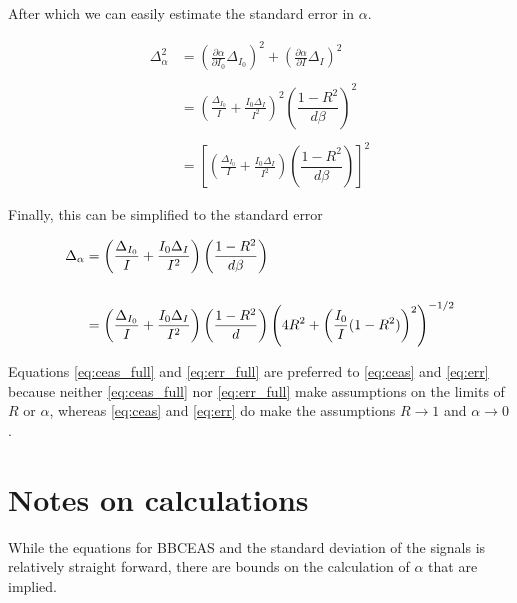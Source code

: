 After which we can easily estimate the standard error in $\alpha$.

\begin{align*}
  \Delta_\alpha^2 &= \left(\frac{\partial \alpha}{\partial I_0} \Delta_{I_0}\right)^2  + \left(\frac{\partial \alpha}{\partial I} \Delta_{I}\right)^2 \\\\
                  &= \left(\frac{\Delta_{I_0}}{I} + \frac{I_0\Delta_{I}}{I^2}\right)^2 \left(\dfrac{1-R^2}{d\beta}\right)^2 \\\\
                  &= \left[\left(\frac{\Delta_{I_0}}{I} + \frac{I_0\Delta_{I}}{I^2}\right)\left(\dfrac{1-R^2}{d\beta}\right)\right]^2
\end{align*}


Finally, this can be simplified to the standard error


\begin{align}
  \Delta_\alpha &= \left(\frac{\Delta_{I_0}}{I} + \frac{I_0\Delta_{I}}{I^2}\right) \left(\dfrac{1-R^2}{d\beta}\right) \notag\\\notag\\
                &= \left(\frac{\Delta_{I_0}}{I} + \frac{I_0\Delta_{I}}{I^2}\right) \left(\dfrac{1-R^2}{d}\right)\left(4R^2+\left(\frac{I_0}{I}(1-R^2)\right)^2\right)^{-1/2} \label{eq:err_full}
\end{align}

Equations \eqref{eq:ceas_full} and \eqref{eq:err_full} are preferred to
\eqref{eq:ceas} and \eqref{eq:err} because neither \eqref{eq:ceas_full} nor
\eqref{eq:err_full} make assumptions on the limits of $R$ or $\alpha$,
whereas \eqref{eq:ceas} and \eqref{eq:err} do make the assumptions $R \to
1$ and $\alpha \to 0$.



\section{Notes on calculations}\label{sec:ceas_eq_notes}

While the equations for \ac{BBCEAS} and the standard deviation of the signals
is relatively straight forward, there are bounds on the calculation of
$\alpha$ that are implied.

